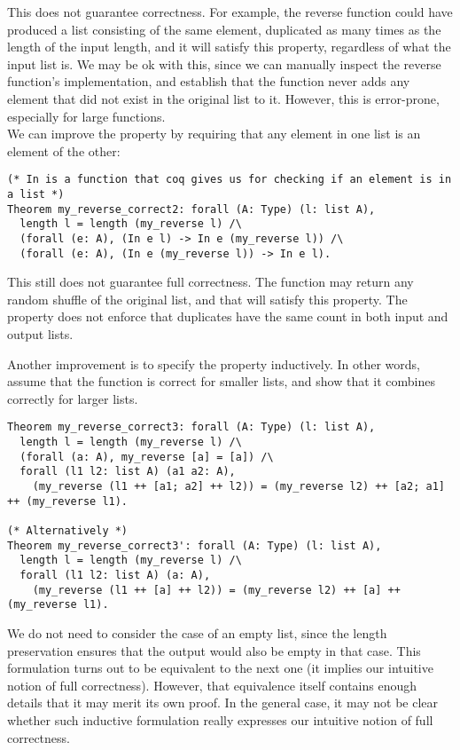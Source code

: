 \documentclass{article}
\begin{document}
This does not guarantee correctness. For example, the reverse function could have produced
a list consisting of the same element, duplicated as many times as the length of the input length,
and it will satisfy this property, regardless of what the input list is. We may be ok with this,
since we can manually inspect the reverse function's implementation, and establish that
the function never adds any element that did not exist in the original list to it. However,
this is error-prone, especially for large functions. \\

We can improve the property by requiring that any element in one list is an element of the other:
\begin{verbatim}
(* In is a function that coq gives us for checking if an element is in a list *)
Theorem my_reverse_correct2: forall (A: Type) (l: list A),
  length l = length (my_reverse l) /\
  (forall (e: A), (In e l) -> In e (my_reverse l)) /\
  (forall (e: A), (In e (my_reverse l)) -> In e l).
\end{verbatim}

This still does not guarantee full correctness. The function may return any random shuffle of the original
list, and that will satisfy this property. The property does not enforce that duplicates have the same
count in both input and output lists.

Another improvement is to specify the property inductively. In other words, assume that the function
is correct for smaller lists, and show that it combines correctly for larger lists.
\begin{verbatim}
Theorem my_reverse_correct3: forall (A: Type) (l: list A),
  length l = length (my_reverse l) /\
  (forall (a: A), my_reverse [a] = [a]) /\
  forall (l1 l2: list A) (a1 a2: A),
    (my_reverse (l1 ++ [a1; a2] ++ l2)) = (my_reverse l2) ++ [a2; a1] ++ (my_reverse l1).
    
(* Alternatively *)
Theorem my_reverse_correct3': forall (A: Type) (l: list A),
  length l = length (my_reverse l) /\
  forall (l1 l2: list A) (a: A),
    (my_reverse (l1 ++ [a] ++ l2)) = (my_reverse l2) ++ [a] ++ (my_reverse l1).
\end{verbatim}

We do not need to consider the case of an empty list, since the length preservation ensures that
the output would also be empty in that case. This formulation turns out to be equivalent to the
next one (it implies our intuitive notion of full correctness). However, that equivalence itself
contains enough details that it may merit its own proof. In the general case, it may not be clear
whether such inductive formulation really expresses our intuitive notion of full correctness.
\end{document}
